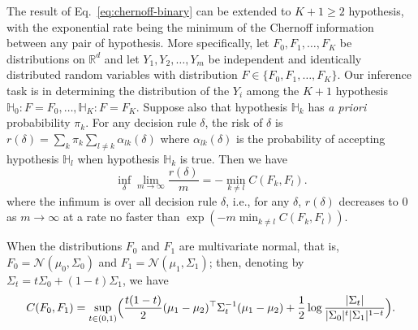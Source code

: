 \documentclass[10pt]{article}
\begin{document}
The result of Eq.~\eqref{eq:chernoff-binary} can be extended to $K + 1 \geq 2$ hypothesis, with the exponential rate being the minimum of the Chernoff information between any pair of hypothesis. More specifically, let $F_0, F_1, \dots, F_{K}$ be distributions on $\mathbb{R}^{d}$ and let $Y_1, Y_2, \dots, Y_m$ be independent and identically distributed random variables with distribution $F \in \{F_0, F_1, \dots, F_K\}$. Our inference task is in determining the distribution of the $Y_i$ among the $K+1$ hypothesis $\mathbb{H}_0 \colon F = F_0, \dots, \mathbb{H}_{K} \colon F = F_K$. Suppose also that hypothesis $\mathbb{H}_k$ has {\em a priori} probabibility $\pi_k$. For any decision rule $\delta$, the risk of $\delta$ is $r(\delta) = \sum_{k} \pi_k \sum_{l \not = k} \alpha_{lk}(\delta) $ where $\alpha_{lk}(\delta)$ is the probability of accepting hypothesis $\mathbb{H}_l$ when hypothesis $\mathbb{H}_k$ is true. Then we have \cite{leang-johnson}
\begin{equation}
\label{eq:chernoff-multiple}
\inf_{\delta} \lim_{m \rightarrow \infty}  \frac{r(\delta)}{m} = - \min_{k \not = l} C(F_k, F_l).
\end{equation}
where the infimum is over all decision rule $\delta$, i.e., for any $\delta$, $r(\delta)$ decreases to $0$ as $m \rightarrow \infty$ at a rate no faster than $\exp(- m \min_{k \not = l} C(F_k, F_l))$. 

When the distributions $F_0$ and $F_1$ are multivariate normal, that is, $F_0 =  \mathcal{N}(\mu_0, \Sigma_0)$ and $F_1 = \mathcal{N}(\mu_1, \Sigma_1)$; then, denoting by $\Sigma_t = t \Sigma_0 + (1 - t) \Sigma_1$, we have 
\begin{equation*}
C(F_0, F_1) = \sup_{t \in (0,1)} \Bigl(\frac{t(1 - t)}{2} (\mu_1 - \mu_2)^{\top}\Sigma_t^{-1}(\mu_1 - \mu_2) + \frac{1}{2} \log \frac{|\Sigma_t|}{|\Sigma_0|^{t} |\Sigma_1|^{1 - t}}  \Bigr).
\end{equation*}
\end{document}
